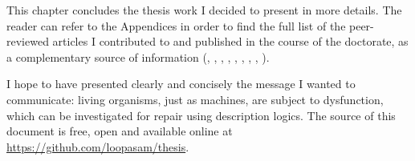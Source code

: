 \hrulefill

This chapter concludes the thesis work I decided to present in more details. The reader can refer to the Appendices in order to find the full list of the peer-reviewed articles I contributed to and published in the course of the doctorate, as a complementary source of information (\cite{croset2013brain}, \cite{croset2013functional}, \cite{croset2010calbc}, \cite{croset2011exploring}, \cite{rebholz2013case}, \cite{yan2012finding}, \cite{herrero2013ontology}, \cite{croset2013brain2}, \cite{croset2012integration}).

I hope to have presented clearly and concisely the message I wanted to communicate: living organisms, just as machines, are subject to dysfunction, which can be investigated for repair using description logics. The source of this document is free, open and available online at \url{https://github.com/loopasam/thesis}.
